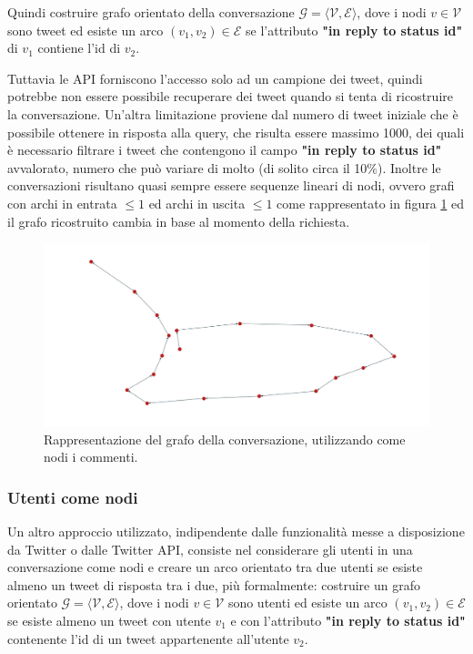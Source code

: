 Quindi costruire grafo orientato della conversazione $\mathcal{G = ⟨V, E⟩}$, dove i nodi $v \in \mathcal{V}$ sono tweet ed esiste un arco $(v_1,v_2) \in \mathcal{E}$ se l'attributo \textbf{"in reply to status id"} di $v_1$ contiene l'id di $v_2$.

Tuttavia le API forniscono l'accesso solo ad un campione dei tweet, quindi potrebbe non essere possibile recuperare dei tweet quando si tenta di ricostruire la conversazione. Un'altra limitazione proviene dal numero di tweet iniziale che è possibile ottenere in risposta alla query, che risulta essere massimo 1000, dei quali è necessario filtrare i tweet che contengono il campo \textbf{"in reply to status id"} avvalorato, numero che può variare di molto (di solito circa il 10\%). Inoltre le conversazioni risultano quasi sempre essere sequenze lineari di nodi, ovvero grafi con archi in entrata $\leq 1$ ed archi in uscita $\leq 1$ come rappresentato in figura \ref{fig:comment-twitter} ed il grafo ricostruito cambia in base al momento della richiesta.

\begin{figure}[ht]
    \includegraphics[width=\linewidth]{Immagini/twitter.png}
    \caption{Rappresentazione del grafo della conversazione, utilizzando come nodi i commenti.}
    \label{fig:comment-twitter}
\end{figure}

\subsubsection {Utenti come nodi}
Un altro approccio utilizzato, indipendente dalle funzionalità messe a disposizione da Twitter o dalle Twitter API, consiste nel considerare gli utenti in una conversazione come nodi e creare un arco orientato tra due utenti se esiste almeno un tweet di risposta tra i due, più formalmente: costruire un grafo orientato $\mathcal{G = ⟨V, E⟩}$, dove i nodi $v \in \mathcal{V}$ sono utenti ed esiste un arco $(v_1,v_2) \in \mathcal{E}$ se esiste almeno un tweet con utente $v_1$ e con l'attributo \textbf{"in reply to status id"} contenente l'id di un tweet appartenente all'utente $v_2$.


